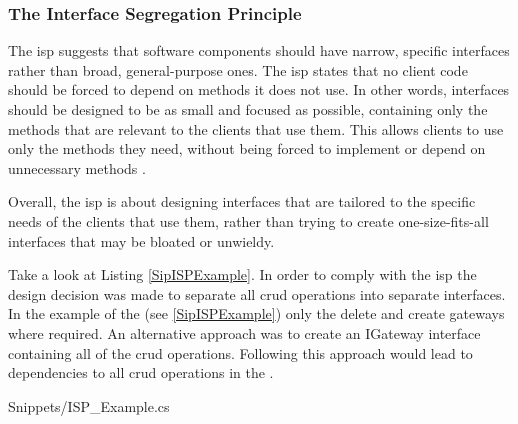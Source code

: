 \subsubsection*{The Interface Segregation Principle} \label{subsubsec:isp}

The \gls{isp} suggests that software components should have narrow, specific interfaces
rather than broad, general-purpose ones. The \gls{isp} states that no client code should
be forced to depend on methods it does not use. In other words, interfaces should be
designed to be as small and focused as possible, containing only the methods that are
relevant to the clients that use them. This allows clients to use only the methods they
need, without being forced to implement or depend on unnecessary methods
\parencite{robert_c_martin_clean_2018}.

Overall, the \gls{isp} is about designing interfaces that are tailored to the specific
needs of the clients that use them, rather than trying to create one-size-fits-all
interfaces that may be bloated or unwieldy.

Take a look at Listing \ref{SipISPExample}. In order to comply with the \gls{isp} the
design decision was made to separate all \gls{crud} operations into separate interfaces.
In the example of the  (see \ref{SipISPExample})
only the delete and create gateways where required. An alternative approach was to create
an IGateway interface containing all of the \gls{crud} operations. Following this approach
would lead to dependencies to all \gls{crud} operations in the
.


    {Snippets/ISP_Example.cs}